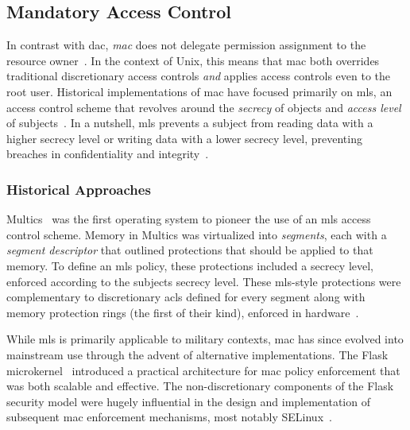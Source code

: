 \subsection{Mandatory Access Control}%
\label{ss:mac}

In contrast with \gls{dac}, \textit{\gls{mac}} does not delegate permission assignment to
the resource owner~\cite{spencer1999_flask, van_oorschot2020_tools_jewels,
jaeger2008_os_security}. In the context of Unix, this means that \gls{mac} both overrides
traditional discretionary access controls \textit{and} applies access controls even to the
root user. Historical implementations of \gls{mac} have focused primarily on \gls{mls}, an
access control scheme that revolves around the \textit{secrecy} of objects and
\textit{access level} of subjects~\cite{bell2005_blp}. In a nutshell, \gls{mls} prevents
a subject from reading data with a higher secrecy level or writing data with a lower
secrecy level, preventing breaches in confidentiality and
integrity~\cite{jaeger2008_os_security}.

\subsubsection*{Historical Approaches}

Multics~\cite{vyssotsky1965_multics, corbato1965_multics} was the first operating system
to pioneer the use of an \gls{mls} access control scheme. Memory in Multics was
virtualized into \textit{segments}, each with a \textit{segment descriptor} that outlined
protections that should be applied to that memory. To define an \gls{mls} policy, these
protections included a secrecy level, enforced according to the subjects secrecy level.
These \gls{mls}-style protections were complementary to discretionary \gls{acl}s defined
for every segment along with memory protection rings (the first of their kind), enforced
in hardware~\cite{jaeger2008_os_security}.

While \gls{mls} is primarily applicable to military contexts, \gls{mac} has since evolved
into mainstream use through the advent of alternative implementations. The Flask
microkernel~\cite{spencer1999_flask} introduced a practical architecture for \gls{mac}
policy enforcement that was both scalable and effective. The non-discretionary components
of the Flask security model were hugely influential in the design and implementation of
subsequent \gls{mac} enforcement mechanisms, most notably
SELinux~\cite{smalley2001_selinux, loscocco2001_selinux}.

